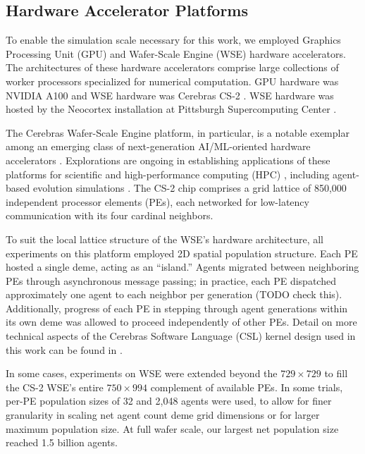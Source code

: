 \subsection{Hardware Accelerator Platforms} \label{sec:hardware}

To enable the simulation scale necessary for this work, we employed Graphics Processing Unit (GPU) and Wafer-Scale Engine (WSE) hardware accelerators.
The architectures of these hardware accelerators comprise large collections of worker processors specialized for numerical computation.
GPU hardware was NVIDIA A100 and WSE hardware was Cerebras CS-2 \citep{choquette2021nvidia,cerebras2021wafer}.
WSE hardware was hosted by the Neocortex installation at Pittsburgh Supercomputing Center \citep{buitrago2021neocortex}.

The Cerebras Wafer-Scale Engine platform, in particular, is a notable exemplar among an emerging class of next-generation AI/ML-oriented hardware accelerators \citep{TODO}.
Explorations are ongoing in establishing applications of these platforms for scientific and high-performance computing (HPC) \citep{TODO}, including agent-based evolution simulations \citep{TODO}.
The CS-2 chip comprises a grid lattice of 850,000 independent processor elements (PEs), each networked for low-latency communication with its four cardinal neighbors.

To suit the local lattice structure of the WSE's hardware architecture, all experiments on this platform employed 2D spatial population structure.
Each PE hosted a single deme, acting as an ``island.''
Agents migrated between neighboring PEs through asynchronous message passing;
in practice, each PE dispatched approximately one agent to each neighbor per generation (TODO check this).
Additionally, progress of each PE in stepping through agent generations within its own deme was allowed to proceed independently of other PEs.
Detail on more technical aspects of the Cerebras Software Language (CSL) kernel design used in this work can be found in \citet{TODO}.

In some cases, experiments on WSE were extended beyond the $729 \times 729$ to fill the CS-2 WSE's entire $750 \times 994$ complement of available PEs.
In some trials, per-PE population sizes of 32 and 2,048 agents were used, to allow for finer granularity in scaling net agent count deme grid dimensions or for larger maximum population size.
At full wafer scale, our largest net population size reached 1.5 billion agents.

